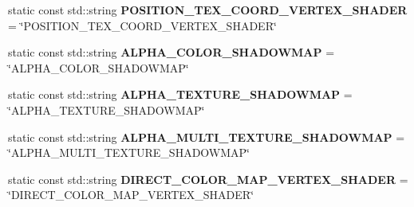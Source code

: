 \begin{DoxyCompactItemize}
\item 
\mbox{\label{struct_geometry_engine_1_1_custom_shading_1_1_custom_shading_constants_a3235e4e2ce35bd49ff9e9c46df9e626b}} 
static const std\+::string {\bfseries P\+O\+S\+I\+T\+I\+O\+N\+\_\+\+T\+E\+X\+\_\+\+C\+O\+O\+R\+D\+\_\+\+V\+E\+R\+T\+E\+X\+\_\+\+S\+H\+A\+D\+ER} = \char`\"{}P\+O\+S\+I\+T\+I\+O\+N\+\_\+\+T\+E\+X\+\_\+\+C\+O\+O\+R\+D\+\_\+\+V\+E\+R\+T\+E\+X\+\_\+\+S\+H\+A\+D\+ER\char`\"{}
\item 
\mbox{\label{struct_geometry_engine_1_1_custom_shading_1_1_custom_shading_constants_ae5772294d25c49f060c7d32286980c66}} 
static const std\+::string {\bfseries A\+L\+P\+H\+A\+\_\+\+C\+O\+L\+O\+R\+\_\+\+S\+H\+A\+D\+O\+W\+M\+AP} = \char`\"{}A\+L\+P\+H\+A\+\_\+\+C\+O\+L\+O\+R\+\_\+\+S\+H\+A\+D\+O\+W\+M\+AP\char`\"{}
\item 
\mbox{\label{struct_geometry_engine_1_1_custom_shading_1_1_custom_shading_constants_a6ae760f2431a2930e081f3a200dcd95e}} 
static const std\+::string {\bfseries A\+L\+P\+H\+A\+\_\+\+T\+E\+X\+T\+U\+R\+E\+\_\+\+S\+H\+A\+D\+O\+W\+M\+AP} = \char`\"{}A\+L\+P\+H\+A\+\_\+\+T\+E\+X\+T\+U\+R\+E\+\_\+\+S\+H\+A\+D\+O\+W\+M\+AP\char`\"{}
\item 
\mbox{\label{struct_geometry_engine_1_1_custom_shading_1_1_custom_shading_constants_a5e81a810fd0eb12bcd586278ab5f3a05}} 
static const std\+::string {\bfseries A\+L\+P\+H\+A\+\_\+\+M\+U\+L\+T\+I\+\_\+\+T\+E\+X\+T\+U\+R\+E\+\_\+\+S\+H\+A\+D\+O\+W\+M\+AP} = \char`\"{}A\+L\+P\+H\+A\+\_\+\+M\+U\+L\+T\+I\+\_\+\+T\+E\+X\+T\+U\+R\+E\+\_\+\+S\+H\+A\+D\+O\+W\+M\+AP\char`\"{}
\item 
\mbox{\label{struct_geometry_engine_1_1_custom_shading_1_1_custom_shading_constants_ab2774963195a2c956eae0f6ce9f2796d}} 
static const std\+::string {\bfseries D\+I\+R\+E\+C\+T\+\_\+\+C\+O\+L\+O\+R\+\_\+\+M\+A\+P\+\_\+\+V\+E\+R\+T\+E\+X\+\_\+\+S\+H\+A\+D\+ER} = \char`\"{}D\+I\+R\+E\+C\+T\+\_\+\+C\+O\+L\+O\+R\+\_\+\+M\+A\+P\+\_\+\+V\+E\+R\+T\+E\+X\+\_\+\+S\+H\+A\+D\+ER\char`\"{}

\end{DoxyCompactItemize}
